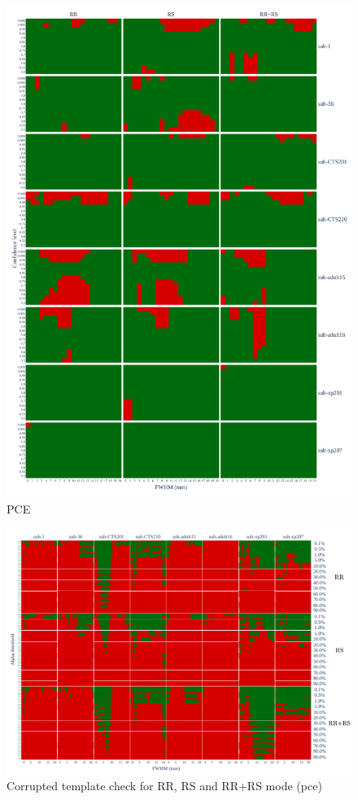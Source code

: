 \documentclass{article}
\begin{document}
\begin{appendices}
    \begin{figure}
        \centering
        \includegraphics[width=\linewidth]{figures/exclude_pce.pdf}
        \caption{PCE}
        \label{fig:loo_pce}
    \end{figure}

    \begin{figure}
        \centering
        \includegraphics[width=\linewidth]{figures/template/template_pce.pdf}
        \caption{Corrupted template check for RR, RS and RR+RS mode (pce)}
    \end{figure}


\end{appendices}
\end{document}
